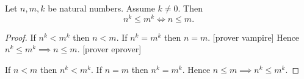 \documentclass[10pt]{article}
\begin{document}
  \begin{forthel}
    \begin{corollary}
      Let $n, m, k$ be natural numbers.
      Assume $k \neq 0$.
      Then \[ n^{k} \leq m^{k} \iff n \leq m. \]
    \end{corollary}
    \begin{proof}
      If $n^{k} < m^{k}$ then $n < m$.
      If $n^{k} = m^{k}$ then $n = m$.
      [prover vampire]
      Hence $n^{k} \leq m^{k} \implies n \leq m$.
      [prover eprover]

      If $n < m$ then $n^{k} < m^{k}$.
      If $n = m$ then $n^{k} = m^{k}$.
      Hence $n \leq m \implies n^{k} \leq m^{k}$.
    \end{proof}
  \end{forthel}
\end{document}
